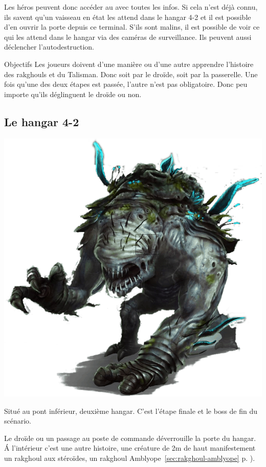Les héros peuvent donc accéder au  avec toutes les infos. Si cela n’est déjà connu, ils savent qu’un vaisseau en état les attend dans le hangar 4-2 et il est possible d’en ouvrir la porte depuis ce terminal. S’ils sont malins, il est possible de voir ce qui les attend dans le hangar via des caméras de surveillance. Ils peuvent aussi déclencher l’autodestruction.

\begin{paperbox}{Objectifs}
Les joueurs doivent d’une manière ou d’une autre apprendre l’histoire des rakghouls et du Talisman. Donc soit par le droïde, soit par la passerelle. Une fois qu’une des deux étapes est passée, l’autre n’est pas obligatoire. Donc peu importe qu’ils déglinguent le droïde ou non.
\end{paperbox}

\subsection{Le hangar 4-2}

\noindent\includegraphics[width=\linewidth]{_img/bestiary/rakghoul-amblyope.png}

Situé au pont inférieur, deuxième hangar. C’est l’étape finale et le boss de fin du scénario.

Le droïde ou un passage au poste de commande déverrouille la porte du hangar. \'A l’intérieur c’est une autre histoire, une créature de 2m de haut manifestement un rakghoul aux stéroïdes, un rakghoul Amblyope~\ref{sec:rakghoul-amblyope} p. \pageref{sec:rakghoul-amblyope}).

